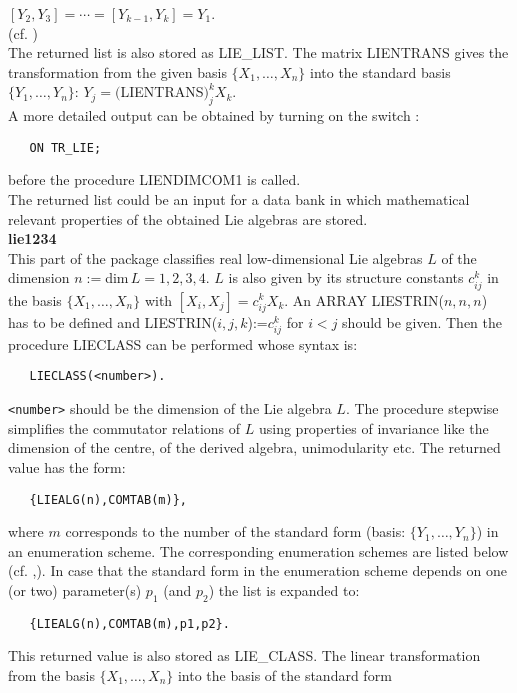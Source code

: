 \hspace*{0.7cm} $[Y_2,Y_3]=\cdots =[Y_{k-1},Y_k]=Y_1$.\\[0.2cm]
(cf. \cite{Schoebel:93})\\[0.2cm]
The returned list is also stored as LIE\_LIST. The matrix LIENTRANS gives the
transformation from the given basis $\{X_1,\ldots ,X_n\}$ into the standard
basis $\{Y_1,\ldots ,Y_n\}$: $Y_j=($LIENTRANS$)_j^k X_k$.\\[0.1cm]
A more detailed output can be obtained by turning on the switch :
\begin{verbatim}
   ON TR_LIE;
\end{verbatim}
before the procedure LIENDIMCOM1 is called.\\[0.1cm]
The returned list could be an input for a data bank in which mathematical
relevant properties of the obtained Lie algebras are stored.\\[0.3cm]
{\large\bf lie1234}\\[0.1cm]
This part of the package classifies real low-dimensional Lie algebras $L$
of the dimension
$n:=$dim$\,L=1,2,3,4$. $L$ is also given by its structure constants $c_{ij}^k$
in the basis $\{X_1,\ldots,X_n\}$ with $[X_i,X_j]=c_{ij}^k X_k$. An ARRAY
LIESTRIN($n,n,n$) has to be defined and LIESTRIN($i,j,k$):=$c_{ij}^k$ for
$i<j$ should be given. Then the procedure LIECLASS can be performed
whose syntax is:
\begin{verbatim}
   LIECLASS(<number>).
\end{verbatim}
{\tt <number>} should be the dimension of the Lie algebra $L$. The procedure
stepwise simplifies the commutator relations of $L$ using properties of
invariance like the dimension of the centre, of the derived algebra,
unimodularity etc.  The returned value has the form:
\begin{verbatim}
   {LIEALG(n),COMTAB(m)},
\end{verbatim}
where $m$ corresponds to the number of the standard form (basis:
$\{Y_1,\ldots,Y_n\}$) in an enumeration scheme. The corresponding enumeration
schemes are listed below (cf. \cite{Schoebel:92},\cite{MacCallum:99}).
In case that the standard form in the enumeration scheme depends on one (or two)
parameter(s) $p_1$ (and $p_2$) the list is expanded to:
\begin{verbatim}
   {LIEALG(n),COMTAB(m),p1,p2}.
\end{verbatim}
This returned value is also stored as LIE\_CLASS. The linear transformation from
the basis $\{X_1,\ldots,X_n\}$ into the basis of the standard form
